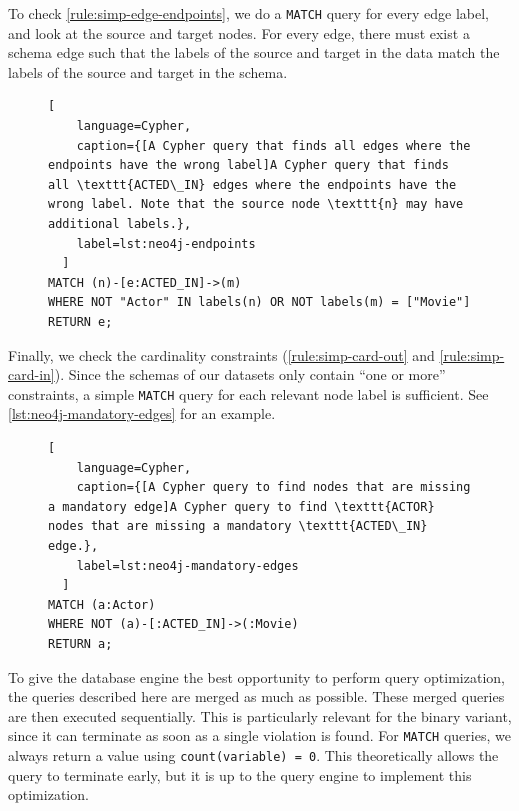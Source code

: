 \documentclass{report}
\theoremstyle{definition}
\begin{document}
To check \autoref{rule:simp-edge-endpoints}, we do a \texttt{MATCH} query for every edge label, and look at the source and target nodes. For every edge, there must exist a schema edge such that the labels of the source and target in the data match the labels of the source and target in the schema.

\begin{figure}[H]
  \begin{lstlisting}[
    language=Cypher,
    caption={[A Cypher query that finds all edges where the endpoints have the wrong label]A Cypher query that finds all \texttt{ACTED\_IN} edges where the endpoints have the wrong label. Note that the source node \texttt{n} may have additional labels.},
    label=lst:neo4j-endpoints
  ]
MATCH (n)-[e:ACTED_IN]->(m)
WHERE NOT "Actor" IN labels(n) OR NOT labels(m) = ["Movie"]
RETURN e;
  \end{lstlisting}
\end{figure}

Finally, we check the cardinality constraints (\autoref{rule:simp-card-out} and \ref{rule:simp-card-in}). Since the schemas of our datasets only contain ``one or more'' constraints, a simple \texttt{MATCH} query for each relevant node label is sufficient. See \autoref{lst:neo4j-mandatory-edges} for an example.

\begin{figure}[H]
  \begin{lstlisting}[
    language=Cypher,
    caption={[A Cypher query to find nodes that are missing a mandatory edge]A Cypher query to find \texttt{ACTOR} nodes that are missing a mandatory \texttt{ACTED\_IN} edge.},
    label=lst:neo4j-mandatory-edges
  ]
MATCH (a:Actor)
WHERE NOT (a)-[:ACTED_IN]->(:Movie)
RETURN a;
  \end{lstlisting}
\end{figure}

To give the database engine the best opportunity to perform query optimization, the queries described here are merged as much as possible. These merged queries are then executed sequentially. This is particularly relevant for the binary variant, since it can terminate as soon as a single violation is found. For \texttt{MATCH} queries, we always return a value using \texttt{count(variable) = 0}. This theoretically allows the query to terminate early, but it is up to the query engine to implement this optimization.
\end{document}
